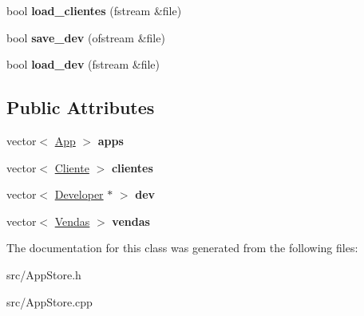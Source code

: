 \begin{DoxyCompactItemize}
\item 
\hypertarget{class_app_store_a10cadeff1412d5cdb49c806746878b7d}{bool {\bfseries load\+\_\+clientes} (fstream \&file)}\label{class_app_store_a10cadeff1412d5cdb49c806746878b7d}

\item 
\hypertarget{class_app_store_a86f8c8d69a134c570ee1ac5208204b35}{bool {\bfseries save\+\_\+dev} (ofstream \&file)}\label{class_app_store_a86f8c8d69a134c570ee1ac5208204b35}

\item 
\hypertarget{class_app_store_ad45df395b61443556fd84f40cdcbd208}{bool {\bfseries load\+\_\+dev} (fstream \&file)}\label{class_app_store_ad45df395b61443556fd84f40cdcbd208}

\end{DoxyCompactItemize}
\subsection*{Public Attributes}
\begin{DoxyCompactItemize}
\item 
\hypertarget{class_app_store_ab618a846f9c32b6897bf3e694af19c43}{vector$<$ \hyperlink{class_app}{App} $>$ {\bfseries apps}}\label{class_app_store_ab618a846f9c32b6897bf3e694af19c43}

\item 
\hypertarget{class_app_store_a6f1aa46e983d0e8fecd103c47c8f7eea}{vector$<$ \hyperlink{class_cliente}{Cliente} $>$ {\bfseries clientes}}\label{class_app_store_a6f1aa46e983d0e8fecd103c47c8f7eea}

\item 
\hypertarget{class_app_store_af62367eceae89987728c11c70318a93a}{vector$<$ \hyperlink{class_developer}{Developer} $\ast$ $>$ {\bfseries dev}}\label{class_app_store_af62367eceae89987728c11c70318a93a}

\item 
\hypertarget{class_app_store_a0b519316efd39486e4577dc95f1dfea3}{vector$<$ \hyperlink{class_vendas}{Vendas} $>$ {\bfseries vendas}}\label{class_app_store_a0b519316efd39486e4577dc95f1dfea3}

\end{DoxyCompactItemize}


The documentation for this class was generated from the following files\+:\begin{DoxyCompactItemize}
\item 
src/App\+Store.\+h\item 
src/App\+Store.\+cpp\end{DoxyCompactItemize}
